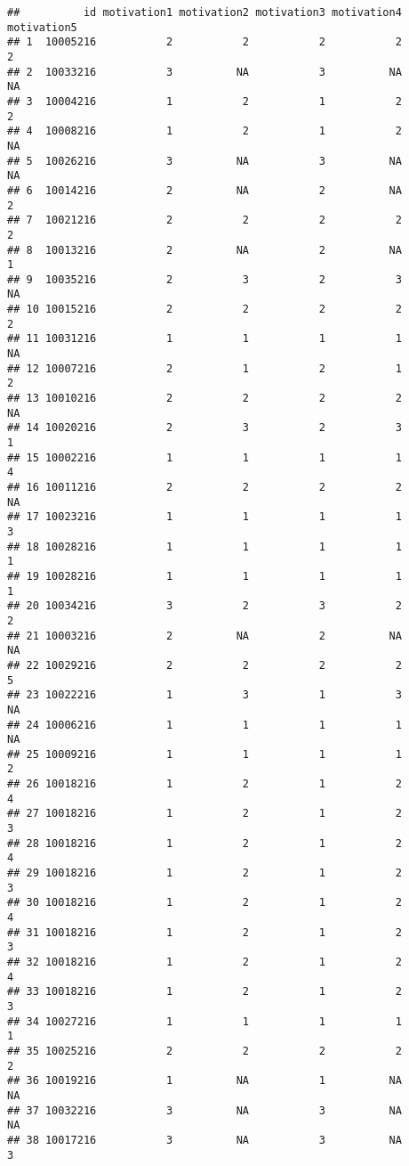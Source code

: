 \documentclass[]{article}
\begin{document}
\begin{verbatim}
##          id motivation1 motivation2 motivation3 motivation4 motivation5
## 1  10005216           2           2           2           2           2
## 2  10033216           3          NA           3          NA          NA
## 3  10004216           1           2           1           2           2
## 4  10008216           1           2           1           2          NA
## 5  10026216           3          NA           3          NA          NA
## 6  10014216           2          NA           2          NA           2
## 7  10021216           2           2           2           2           2
## 8  10013216           2          NA           2          NA           1
## 9  10035216           2           3           2           3          NA
## 10 10015216           2           2           2           2           2
## 11 10031216           1           1           1           1          NA
## 12 10007216           2           1           2           1           2
## 13 10010216           2           2           2           2          NA
## 14 10020216           2           3           2           3           1
## 15 10002216           1           1           1           1           4
## 16 10011216           2           2           2           2          NA
## 17 10023216           1           1           1           1           3
## 18 10028216           1           1           1           1           1
## 19 10028216           1           1           1           1           1
## 20 10034216           3           2           3           2           2
## 21 10003216           2          NA           2          NA          NA
## 22 10029216           2           2           2           2           5
## 23 10022216           1           3           1           3          NA
## 24 10006216           1           1           1           1          NA
## 25 10009216           1           1           1           1           2
## 26 10018216           1           2           1           2           4
## 27 10018216           1           2           1           2           3
## 28 10018216           1           2           1           2           4
## 29 10018216           1           2           1           2           3
## 30 10018216           1           2           1           2           4
## 31 10018216           1           2           1           2           3
## 32 10018216           1           2           1           2           4
## 33 10018216           1           2           1           2           3
## 34 10027216           1           1           1           1           1
## 35 10025216           2           2           2           2           2
## 36 10019216           1          NA           1          NA          NA
## 37 10032216           3          NA           3          NA          NA
## 38 10017216           3          NA           3          NA           3
\end{verbatim}
\end{document}
